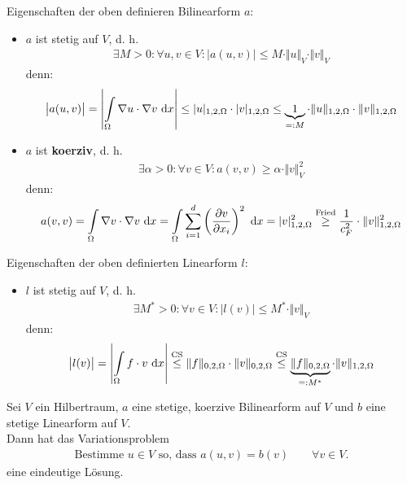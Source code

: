 Eigenschaften der oben definieren Bilinearform $a$:
\begin{itemize}
	\item $a$ ist stetig auf $V$, d. h.
	\begin{align*}
		\exists M>0:\forall u,v\in V:\big|a(u,v)\big|\leq M\cdot\Vert u\Vert_V\cdot\Vert v\Vert_V
	\end{align*}
	denn:
	\begin{align*}
		\big| a(u,v)\big|=\left|\int\limits_\Omega\nabla u\cdot\nabla v\text{ d} x\right|
		\leq
		|u|_{1,2,\Omega}\cdot|v|_{1,2,\Omega}
		\leq
		\underbrace{1}_{=:M}\cdot\Vert u\Vert_{1,2,\Omega}\cdot\Vert v\Vert_{1,2,\Omega}
	\end{align*}
	\item $a$ ist \textbf{koerziv}, d. h.
	\begin{align*}
		\exists\alpha>0:\forall v\in V:a(v,v)\geq\alpha\cdot\Vert v\Vert^2_V
	\end{align*}
	denn:
	\begin{align*}
		a(v,v)
		=\int\limits_\Omega\nabla v\cdot\nabla v\text{ d} x
		=\int\limits_\Omega\sum\limits_{i=1}^d\left(\frac{\partial v}{\partial x_i}\right)^2\text{ d} x
		=|v|^2_{1,2,\Omega}
		\stackrel{\text{Fried}}{\geq}
		\frac{1}{c_F^2}\cdot\Vert v\Vert^2_{1,2,\Omega}
	\end{align*}
\end{itemize}

Eigenschaften der oben definierten Linearform $l$:
\begin{itemize}
	\item $l$ ist stetig auf $V$, d. h.
	\begin{align*}
		\exists M^\ast>0:\forall v\in V: \big|l(v)\big|\leq M^\ast\cdot\Vert v\Vert_V
	\end{align*}
	denn:
	\begin{align*}
		\big| l(v)\big|=\left|\int\limits_\Omega f\cdot v\text{ d} x\right|
		\stackrel{\text{CS}}{\leq}
		\Vert f\Vert_{0,2,\Omega}\cdot\Vert v\Vert_{0,2,\Omega}
		\stackrel{\text{CS}}{\leq}
		\underbrace{\Vert f\Vert_{0,2,\Omega}}_{=:M^\ast}\cdot\Vert v\Vert_{1,2,\Omega}
	\end{align*}
\end{itemize}

\begin{theorem}\label{theorem2.1LaxMilgram}\enter
	Sei $V$ ein Hilbertraum, $a$ eine stetige, koerzive Bilinearform auf $V$ und $b$ eine stetige Linearform auf $V$.\\
	Dann hat das Variationsproblem
	\begin{align*}
		\text{Bestimme $u\in V$ so, dass }a(u,v)=b(v)\qquad\forall v\in V.
	\end{align*}
	eine eindeutige Lösung.
\end{theorem}

